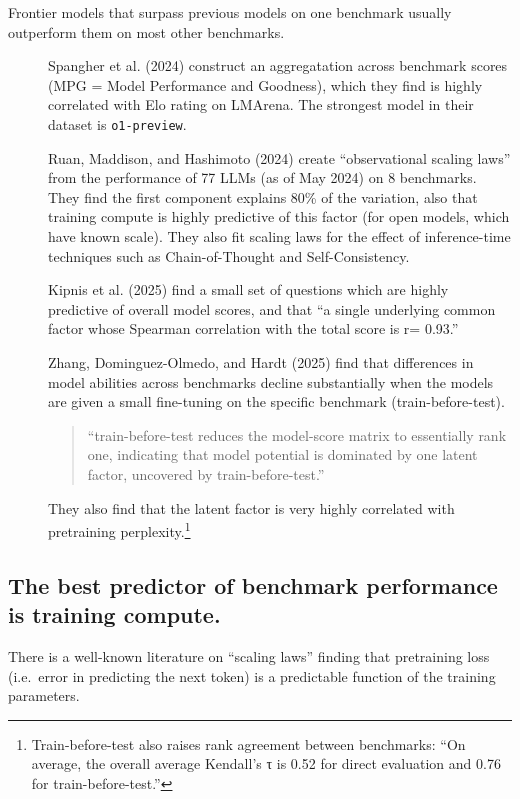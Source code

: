 \documentclass[
  letterpaper,
  DIV=11,
  numbers=noendperiod,
  oneside]{scrartcl}
\begin{document}
\begin{description}
\item[Frontier models that surpass previous models on one benchmark
usually outperform them on most other benchmarks.]
Spangher et al. (2024) construct an aggregatation across benchmark
scores (MPG = Model Performance and Goodness), which they find is highly
correlated with Elo rating on LMArena. The strongest model in their
dataset is \texttt{o1-preview}.

Ruan, Maddison, and Hashimoto (2024) create ``observational scaling
laws'' from the performance of 77 LLMs (as of May 2024) on 8 benchmarks.
They find the first component explains 80\% of the variation, also that
training compute is highly predictive of this factor (for open models,
which have known scale). They also fit scaling laws for the effect of
inference-time techniques such as Chain-of-Thought and Self-Consistency.

Kipnis et al. (2025) find a small set of questions which are highly
predictive of overall model scores, and that ``a single underlying
common factor whose Spearman correlation with the total score is r=
0.93.''

Zhang, Dominguez-Olmedo, and Hardt (2025) find that differences in model
abilities across benchmarks decline substantially when the models are
given a small fine-tuning on the specific benchmark (train-before-test).

\begin{quote}
``train-before-test reduces the model-score matrix to essentially rank
one, indicating that model potential is dominated by one latent factor,
uncovered by train-before-test.''
\end{quote}

They also find that the latent factor is very highly correlated with
pretraining perplexity.\footnote{Train-before-test also raises rank
  agreement between benchmarks: ``On average, the overall average
  Kendall's τ is 0.52 for direct evaluation and 0.76 for
  train-before-test.''}
\end{description}

\subsection{The best predictor of benchmark performance is training
compute.}\label{the-best-predictor-of-benchmark-performance-is-training-compute.}

There is a well-known literature on ``scaling laws'' finding that
pretraining loss (i.e.~error in predicting the next token) is a
predictable function of the training parameters.
\end{document}
